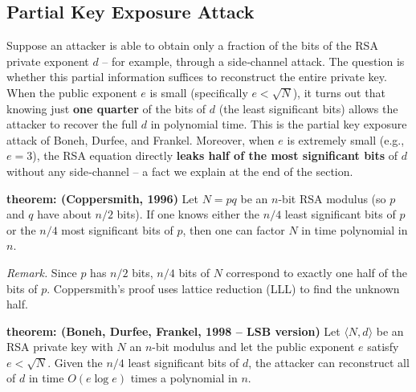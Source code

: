 \subsection{Partial Key Exposure Attack}

Suppose an attacker  is able to obtain only a fraction of the bits of the RSA private exponent \(d\) – for example, through a side‑channel attack. The question is whether this partial information suffices to reconstruct the entire private key. When the public exponent \(e\) is small (specifically \(e<\sqrt{N}\)), it turns out that knowing just \textbf{one quarter} of the bits of \(d\) (the least significant bits) allows the attacker to recover the full \(d\) in polynomial time. This is the partial key exposure attack of Boneh, Durfee, and Frankel. Moreover, when \(e\) is extremely small (e.g., \(e=3\)), the RSA equation directly \textbf{leaks half of the most significant bits} of \(d\) without any side‑channel – a fact we explain at the end of the section.

\textbf{theorem: (Coppersmith, 1996)}
Let \(N=pq\) be an \(n\)-bit RSA modulus (so \(p\) and \(q\) have about \(n/2\) bits). If one knows either the \(n/4\) least significant bits of \(p\) or the \(n/4\) most significant bits of \(p\), then one can factor \(N\) in time polynomial in \(n\).


\noindent\textit{Remark.} Since \(p\) has \(n/2\) bits, \(n/4\) bits of \(N\) correspond to exactly one half of the bits of \(p\). Coppersmith's proof uses lattice reduction (LLL) to find the unknown half.

\textbf{theorem: (Boneh, Durfee, Frankel, 1998 – LSB version)}
Let \(\langle N,d\rangle\) be an RSA private key with \(N\) an \(n\)-bit modulus and let the public exponent \(e\) satisfy \(e<\sqrt{N}\). Given the \(n/4\) least significant bits of \(d\), the attacker can reconstruct all of \(d\) in time \(O(e\log e)\) times a polynomial in \(n\).


